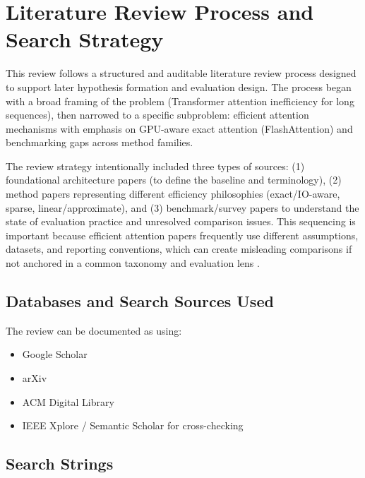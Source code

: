 \documentclass[12pt, a4paper]{article}
\begin{document}
\section{Literature Review Process and Search Strategy}

This review follows a structured and auditable literature review process designed to support later hypothesis formation and evaluation design. The process began with a broad framing of the problem (Transformer attention inefficiency for long sequences), then narrowed to a specific subproblem: efficient attention mechanisms with emphasis on GPU-aware exact attention (FlashAttention) and benchmarking gaps across method families.

The review strategy intentionally included three types of sources: (1) foundational architecture papers (to define the baseline and terminology), (2) method papers representing different efficiency philosophies (exact/IO-aware, sparse, linear/approximate), and (3) benchmark/survey papers to understand the state of evaluation practice and unresolved comparison issues. This sequencing is important because efficient attention papers frequently use different assumptions, datasets, and reporting conventions, which can create misleading comparisons if not anchored in a common taxonomy and evaluation lens \parencite{10.1145/3530811, tay2020longrangearenabenchmark, zhang2025cabcomprehensiveattentionbenchmarking}.

\subsection{Databases and Search Sources Used}

The review can be documented as using:
\begin{itemize}
    \item Google Scholar
    \item arXiv
    \item ACM Digital Library
    \item IEEE Xplore / Semantic Scholar for cross-checking
\end{itemize}

\subsection{Search Strings}
\end{document}
